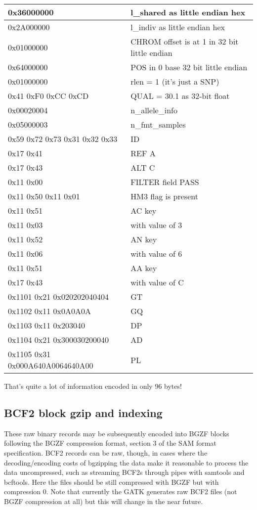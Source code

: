 \documentclass[8pt]{article}
\begin{document}
\vspace{0.3cm}
\begin{tabular}{|l| l|} \hline
0x36000000 & l\_shared as little endian hex \\ \hline
0x2A000000 & l\_indiv as little endian hex \\ \hline
0x01000000 & CHROM offset is at 1 in 32 bit little endian \\ \hline
0x64000000 & POS in 0 base 32 bit little endian \\ \hline
0x01000000 & rlen = 1 (it's just a SNP) \\ \hline
0x41 0xF0 0xCC 0xCD & QUAL = 30.1 as 32-bit float \\ \hline
0x00020004 & n\_allele\_info \\ \hline
0x05000003 & n\_fmt\_samples \\ \hline
0x59 0x72 0x73 0x31 0x32 0x33 & ID \\ \hline
0x17 0x41 & REF A \\ \hline
0x17 0x43 & ALT C \\ \hline
0x11 0x00 & FILTER field PASS \\ \hline
0x11 0x50 0x11 0x01 & HM3 flag is present \\ \hline
0x11 0x51 & AC key \\ \hline
0x11 0x03 & with value of 3 \\ \hline
0x11 0x52 & AN key \\ \hline
0x11 0x06 & with value of 6 \\ \hline
0x11 0x51 & AA key \\ \hline
0x17 0x43 & with value of C \\ \hline
0x1101 0x21 0x020202040404 & GT \\ \hline
0x1102 0x11 0x0A0A0A & GQ \\ \hline
0x1103 0x11 0x203040 & DP \\ \hline
0x1104 0x21 0x300030200040 & AD \\ \hline
0x1105 0x31 0x000A640A0064640A00 & PL \\ \hline
\end{tabular}
\vspace{0.3cm}

That's quite a lot of information encoded in only 96 bytes!

\subsection{BCF2 block gzip and indexing}

These raw binary records may be subsequently encoded into BGZF blocks following
the BGZF compression format, section 3 of the SAM format specification.
BCF2 records can be raw, though, in cases where the decoding/encoding costs of
bgzipping the data make it reasonable to process the data uncompressed, such as
streaming BCF2s through pipes with samtools and bcftools.  Here the files
should be still compressed with BGZF but with compression 0.  Note that
currently the GATK generates raw BCF2 files (not BGZF compression at all) but
this will change in the near future.
\end{document}
